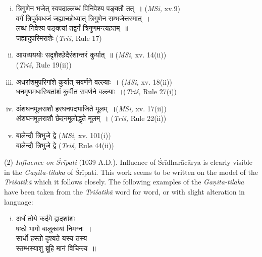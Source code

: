 \documentclass[10pt, openany]{book}
\begin{document}
\begin{enumerate}[(i)]
    \item {\qt त्रिगुणेन भजेत् स्वपदाल्लब्धं विनिवेश्य पङ्क्तौ तत्~।} \englishfont\hfill{(\textit{MSi,} xv.9) }\\
		 {\qt वर्गं त्रिपूर्ववधजं जह्याच्छोध्यात् त्रिगुणेन सम्भजेत्तस्मात्~। \\
 लब्धं निवेश्य पङ्क्त्यां तद्वर्गं त्रिगुणमन्त्यहतम्~॥ \\
 जह्यादुपरिमराशेः} \englishfont \hfill{(\textit{Triś,} Rule 17)} 
    \item {\qt आयव्यययोः सदृशैश्छेदैरंशान्तरं कुर्यात्~॥ } \englishfont \hfill{(\textit{MSi,} xv. 14(ii))}\\
    {}\englishfont\hfill{(\textit{Triś, }Rule 19(ii))}
    \item {\qt अधरांशमुपरिगांशे कुर्यात् सवर्णने वल्ल्याः~। }\englishfont \hfill{(\textit{MSi,} xv. 18(ii)) }\\
    {\qt धनमृणमधःस्थितांशं कुर्वीत सवर्णने वल्ल्याः~।}\englishfont\hfill{(\textit{Triś,} Rule 27(i)) }
    \item {\qt अंशघनमूलराशौ हरघनपदभाजिते मूलम्~।}\englishfont \hfill{(\textit{MSi,} xv. 17(ii)) }\\
    {\qt अंशघनमूलराशौ छेदनमूलोद्धृते मूलम्~।} \englishfont \hfill{(\textit{Triś,} Rule 22(ii)) }
    \item {\qt बालेन्दौ त्रिभुजे द्वे} \englishfont \hfill{(\textit{MSi,} xv. 101(i)) }\\
    {\qt बालेन्दौ त्रिभुजे द्वे} \englishfont \hfill{(\textit{Triś,} Rule 44(ii)) }
\end{enumerate}
\vspace{3mm} 

 (2) \textit{Influence on Śrīpati} (1039 A.D.). Influence of Śrīdharācārya is clearly visible in the \textit{Gaṇita-tilaka} of Śrīpati. 
This work seems to be written on the model of the \textit{Triśatikā}
{which it follows closely. The following examples of the \textit{Gaṇita-tilaka} have been taken from the\textit{ Triśatikā} word for word, or}
{with slight alteration in language:}

\begin{enumerate}[(i)]
    \item {\qt अर्धं तोये कर्दमे द्वादशांशः\\
{षष्ठो भागो बालुकायां निमग्नः~।}\\
 {सार्धो हस्तो दृश्यते यस्य तस्य}\\
{स्तम्भस्याशु ब्रूहि मानं विचिन्त्य~॥}} 
\end{enumerate}
\end{document}
